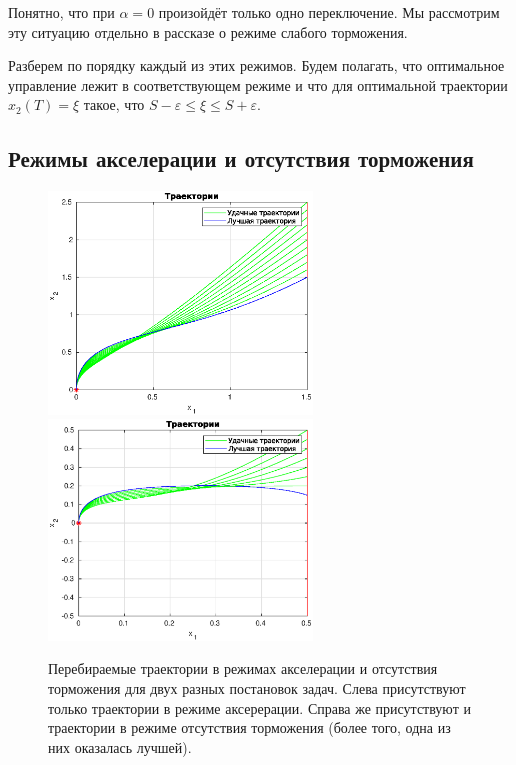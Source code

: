 \begin{remark}
        Понятно, что при $\alpha = 0$ произойдёт только одно переключение. Мы рассмотрим эту ситуацию отдельно в рассказе о режиме слабого торможения.
\end{remark}

Разберем по порядку каждый из этих режимов. Будем полагать, что оптимальное управление лежит в соответствующем режиме и что для оптимальной траектории $x_2(T) = \xi$ такое, что $S - \varepsilon \leqslant \xi \leqslant S + \varepsilon$.

\subsection{Режимы акселерации и отсутствия торможения}

\begin{figure}[h]
        \hfill
        \includegraphics[width=70mm]{first/acc1.eps}
        \hfill
        \hfill
        \includegraphics[width=70mm]{first/acc2.eps}
        \hfill
        \caption{Перебираемые траектории в режимах акселерации и отсутствия торможения для двух разных постановок задач. Слева присутствуют только траектории в режиме аксерерации. Справа же присутствуют и траектории в режиме отсутствия торможения (более того, одна из них оказалась лучшей).}
\end{figure}


